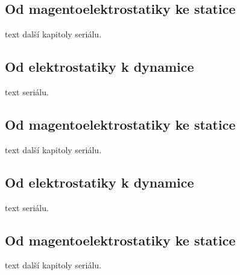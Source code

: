\documentclass[twoside,fykos]{fksserie}
\begin{document}
\subsection{Od magentoelektrostatiky ke statice}
text další kapitoly seriálu.

\subsection{Od elektrostatiky k dynamice}
text seriálu.

\subsection{Od magentoelektrostatiky ke statice}
text další kapitoly seriálu.

\subsection{Od elektrostatiky k dynamice}
text seriálu.

\subsection{Od magentoelektrostatiky ke statice}
text další kapitoly seriálu.

\listoffigures


\makefooter %
\end{document}
